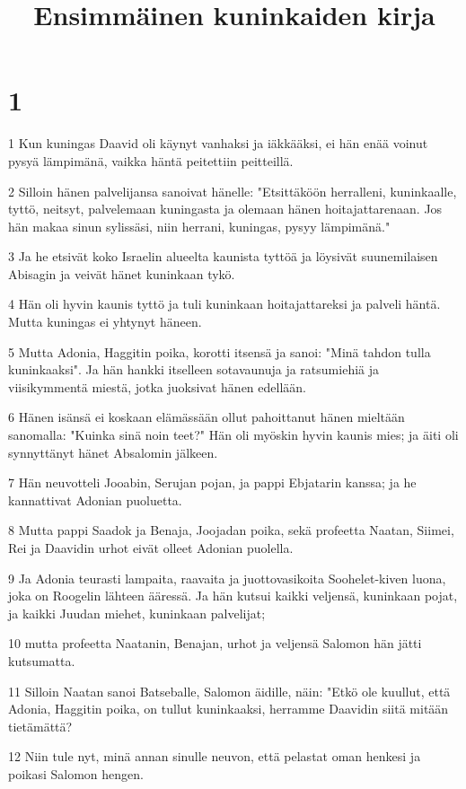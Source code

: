 

\title{Ensimmäinen kuninkaiden kirja}


\chapter{1}

\par 1 Kun kuningas Daavid oli käynyt vanhaksi ja iäkkääksi, ei hän enää voinut pysyä lämpimänä, vaikka häntä peitettiin peitteillä.
\par 2 Silloin hänen palvelijansa sanoivat hänelle: "Etsittäköön herralleni, kuninkaalle, tyttö, neitsyt, palvelemaan kuningasta ja olemaan hänen hoitajattarenaan. Jos hän makaa sinun sylissäsi, niin herrani, kuningas, pysyy lämpimänä."
\par 3 Ja he etsivät koko Israelin alueelta kaunista tyttöä ja löysivät suunemilaisen Abisagin ja veivät hänet kuninkaan tykö.
\par 4 Hän oli hyvin kaunis tyttö ja tuli kuninkaan hoitajattareksi ja palveli häntä. Mutta kuningas ei yhtynyt häneen.
\par 5 Mutta Adonia, Haggitin poika, korotti itsensä ja sanoi: "Minä tahdon tulla kuninkaaksi". Ja hän hankki itselleen sotavaunuja ja ratsumiehiä ja viisikymmentä miestä, jotka juoksivat hänen edellään.
\par 6 Hänen isänsä ei koskaan elämässään ollut pahoittanut hänen mieltään sanomalla: "Kuinka sinä noin teet?" Hän oli myöskin hyvin kaunis mies; ja äiti oli synnyttänyt hänet Absalomin jälkeen.
\par 7 Hän neuvotteli Jooabin, Serujan pojan, ja pappi Ebjatarin kanssa; ja he kannattivat Adonian puoluetta.
\par 8 Mutta pappi Saadok ja Benaja, Joojadan poika, sekä profeetta Naatan, Siimei, Rei ja Daavidin urhot eivät olleet Adonian puolella.
\par 9 Ja Adonia teurasti lampaita, raavaita ja juottovasikoita Soohelet-kiven luona, joka on Roogelin lähteen ääressä. Ja hän kutsui kaikki veljensä, kuninkaan pojat, ja kaikki Juudan miehet, kuninkaan palvelijat;
\par 10 mutta profeetta Naatanin, Benajan, urhot ja veljensä Salomon hän jätti kutsumatta.
\par 11 Silloin Naatan sanoi Batseballe, Salomon äidille, näin: "Etkö ole kuullut, että Adonia, Haggitin poika, on tullut kuninkaaksi, herramme Daavidin siitä mitään tietämättä?
\par 12 Niin tule nyt, minä annan sinulle neuvon, että pelastat oman henkesi ja poikasi Salomon hengen.
